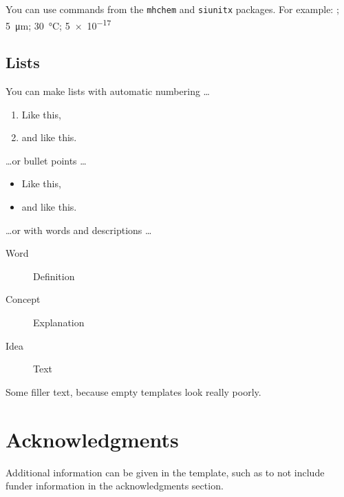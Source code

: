 \documentclass[9pt,lineno]{crone}
\begin{document}
You can use commands from the \texttt{mhchem} and \texttt{siunitx} packages. For example: ; \SI{5}{\micro\metre}; \SI{30}{\degreeCelsius}; \SI{5e-17}{\Molar}

\subsection{Lists}

You can make lists with automatic numbering \dots

\begin{enumerate}
\item Like this,
\item and like this.
\end{enumerate}
\dots or bullet points \dots
\begin{itemize} 
\item Like this,
\item and like this.
\end{itemize}
\dots or with words and descriptions \dots
\begin{description}
\item[Word] Definition
\item[Concept] Explanation
\item[Idea] Text
\end{description}

Some filler text, because empty templates look really poorly. \lipsum[1]


\section{Acknowledgments}

Additional information can be given in the template, such as to not include funder information in the acknowledgments section.



\end{document}
